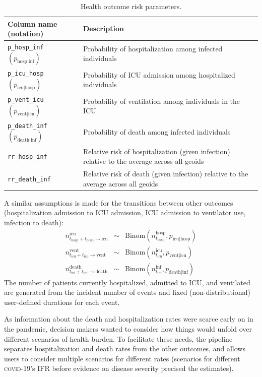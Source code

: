 {\begin{table}[t]
\label{tab:csp-outcomes}
\centering
\begin{tabular}{ll}
\toprule
 Column name (notation) & Description\\
\midrule
\verb|p_hosp_inf| $(p_{\text{hosp} \mid \text{inf}})$	& Probability of hospitalization among infected individuals\\
\verb|p_icu_hosp| $(p_{\text{icu} \mid \text{hosp}})$	&Probability of ICU admission among hospitalized individuals\\
\verb|p_vent_icu| $(p_{\text{vent} \mid \text{icu}})$ &	Probability of ventilation among individuals in the ICU\\
\verb|p_death_inf| $(p_{\text{death} \mid \text{inf}})$ &	Probability of death among infected individuals\\
\verb|rr_hosp_inf|	& Relative risk of hospitalization (given infection) relative to the average across all geoids\\
\verb|rr_death_inf| & Relative risk of death (given infection) relative to the average across all geoids\\
\bottomrule
\end{tabular}
\caption[Health outcome risk parameters]{Health outcome risk parameters.}
\end{table}

A similar assumptions is made for the transitions between other outcomes (hospitalization admission to ICU admission, ICU admission to ventilator use, infection to death):
\begin{eqnarray}
n_{t_\text{hosp} + t_\text{hosp}\to \text{icu}}^\text{icu} &\sim & \text{Binom}\left(n_{t_\text{hosp}}^\text{hosp} , p_{\text{icu}\mid \text{hosp}} \right)\\
n_{t_\text{icu} + t_\text{icu} \to \text{vent}}^\text{vent} &\sim & \text{Binom}\left(n_{t_\text{icu}}^\text{icu}, p_{\text{vent} \mid \text{icu}} \right) \\
n_{t_\text{inf} + t_\text{inf} \to \text{death}}^\text{death} &\sim & \text{Binom}\left(n_{t_\text{inf}}^\text{inf}, p_{\text{death}\mid \text{inf}}  \right)
\end{eqnarray}
The number of patients currently hospitalized, admitted to ICU, and ventilated are generated from the incident number of events and fixed (non-distributional) user-defined durations for each event.

As information about the death and hospitalization rates were scarce early on in the pandemic, decision makers wanted to consider how things would unfold over different scenarios of health burden. To facilitate these needs, the pipeline separates hospitalization and death rates from the other outcomes, and allows users to consider multiple scenarios for different rates (\eg scenarios for different \textsc{covid}-19's IFR before evidence on disease severity precised the estimates).

}
